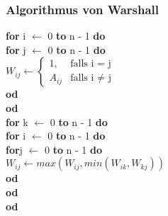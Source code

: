 \documentclass{beamer}
\begin{document}
\begin{frame}
	\frametitle{Algorithmus von Warshall}

	\hspace{0.5 cm} \textbf{for} i $\leftarrow$ 0 \textbf{to} n - 1 \textbf{do} \\
	\hspace{1 cm} \textbf{for} j $\leftarrow$ 0 \textbf{to} n - 1 \textbf{do} \\
	\hspace{1.5 cm}	$W_{ij} \leftarrow 
			\begin{cases}
				1,  & \text{falls i = j}\\
				 A_{ij}  & \text{falls i $\ne$ j}
			\end{cases}$ \\
	\hspace{1 cm} \textbf{od}\\
	\hspace{0.5 cm} \textbf{od}\\
	\vspace{0.5 cm}
	\hspace{0.5 cm} \textbf{for} k $\leftarrow$ 0 \textbf{to} n - 1 \textbf{do} \\
	\hspace{1 cm} \textbf{for} i $\leftarrow$ 0 \textbf{to} n - 1 \textbf{do} \\
	\hspace{1.5 cm} \textbf{for}j $\leftarrow$ 0 \textbf{to} n - 1 \textbf{do} \\
	\hspace{2 cm} $W_{ij} \leftarrow max( W_{ij}, min(W_{ik}, W_{kj}) )$\\
	\hspace{1.5 cm} \textbf{od}	\\
	\hspace{1 cm} \textbf{od}	\\
	\hspace{0.5 cm} \textbf{od}	
\end{frame}
\end{document}
